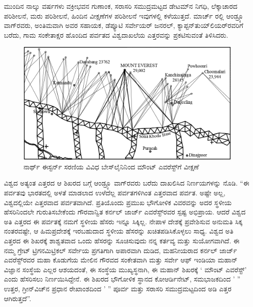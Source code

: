 ಮುಂದಿನ ನಾಲ್ಕು ವರ್ಷಗಳು ವಕ್ರೀಭವನ ಗುಣಾಂಕ, ಸರಾಸರಿ ಸಮುದ್ರಮಟ್ಟದ ಡೇಟಮ್‌ನ ನಿಗಧಿ, ಲೆಕ್ಕಾಚಾರದ ಪರಿಶೀಲನೆ, ಮರು ಪರಿಶೀಲನೆ, ಹಿಂದಿನ ವೀಕ್ಷಣೆಗಳ ಪರಿಶೀಲನೆ ಇವುಗಳಲ್ಲಿ ಕಳೆಯುತ್ತದೆ. ಮಾರ್ಚ್ ರಲ್ಲಿ ಆಂಡ್ರ್ಯೂ ವಾಗ್​ರವರು, ಅಂತಿಮವಾಗಿ ಅವರ ಸಹಾಯಕ, ಡೆಪ್ಯೂಟಿ ಸರ್ವೇಯರ್​ ಜನರಲ್​, ಕ್ಯಾಪ್ಟನ್​ ತುಯ್​ಲಿಯರ್​\break ರವರಿಗೆ ಬರೆದು, ಗಾಮ ಸಂಕೇತಾಕ್ಷರ ಹೊಂದಿದ ಪರ್ವತದ ವಿಶ್ವದಾಖಲೆಯ ಎತ್ತರವನ್ನು ಪ್ರಕಟಿಸುವಂತೆ ತಿಳಿಸಿದರು.

\begin{figure}[!htbp]
\includegraphics{"images/image020.jpg"}
\caption{ನಾರ್ಥ್ ಈಸ್ಟರ್ನ್ ಸರಣಿಯ ವಿವಿಧ ಬೇಸ್‌ಲೈನಿನಿಂದ ಮೌಂಟ್​ ಎವರೆಸ್ಟ್​ಗೆ ವೀಕ್ಷಣೆ}\label{art15-fig2}
\end{figure}

\newpage

ವಿಶ್ವದ ಅತ್ಯಂತ ಎತ್ತರದ ಆ ಶಿಖರದ ಬಗ್ಗೆ ಆಂಡ್ರ್ಯೂ ವಾಗ್​ರವರು ಬರೆದು ದಾಖಲಿಸಿದ ನಿರ್ಣಯಗಳನ್ನು ನೊಡಿ. “ಈ ಪರ್ವತವು ಭಾರತದಲ್ಲಿ ಅಳತೆ ಮಾಡಲಾದ ಉಳೆದೆಲ್ಲ ಪರ್ವತಗಳಿಗಿಂತ ಎತ್ತರವಾದ ಪರ್ವತ. ಅಷ್ಟೇ ಅಲ್ಲ, ವಿಶ್ವದಲ್ಲಿಯೇ ಎತ್ತರವಾದ ಪರ್ವತವಾಗಿದೆ. ಪ್ರತಿಯೊಂದು ಪ್ರಮುಖ ಭೌಗೋಳಿಕ ವಿವರವನ್ನು ಅದರ ಸ್ಥಳೀಯ ಹೆಸರಿನಿಂದಲೇ ಗುರುತಿಸಬೇಕೆಂದು ಗೌರವಾನ್ವಿತ ಕರ್ನಲ್​ ಜಾರ್ಜ್ ಎವರೆಸ್ಟ್​ರವರ ಸ್ಪಷ್ಟ ಅಭಿಪ್ರಾಯ. ಆದರೆ ವಿಶ್ವದ ಅತಿ ಎತ್ತರದ ಈ ಪರ್ವತಕ್ಕೆ ನಮಗೆ ಸ್ಥಳೀಯ ಹೆಸರು ಇನ್ನೂ ಸಿಕ್ಕಿಲ್ಲ. ನೇಪಾಳ ದೇಶಕ್ಕೆ ಪ್ರವೇಶಿಸುವ ಅನುಮತಿ ಸಿಕ್ಕ ನಂತರವಷ್ಟೇ, ಆ ಹಿಮಪ್ರದೇಶಕ್ಕೆ ಇರಬಹುದಾದ ಸ್ಥಳೀಯ ಹೆಸರನ್ನು ಖಚಿತಪಡಿಸಿಕೊಳ್ಳಲು ಸಾಧ್ಯ. ವಿಶ್ವದ ಅತಿ ಎತ್ತರದ ಈ ಶಿಖರಕ್ಕೆ ಶಾಶ್ವತವಾದ ಒಂದು ಹೆಸರನ್ನು ಸೂಚಿಸುವುದು ನನ್ನ ಕರ್ತವ್ಯ ಮತ್ತು ಸುಯೋಗವಾಗಿದೆ. ಈ ನಮ್ಮ ಗ್ರೇಟ್​ ಟ್ರಿಗನಮಿಟ್ರಿಕಲ್​ ಸರ್ವೇಯ ಪ್ರಗತಿಗಾಗಿ ಅಪಾರವಾಗಿ ದುಡಿದ, ಮಹನೀಯರಾದ ಕರ್ನಲ್​ ಜಾರ್ಜ್ ಎವರೆಸ್ಟ್​ರವರ ಮಹಾ ಕೊಡುಗೆಯ ಮೇಲಿನ ಗೌರವದ ಸಂಕೇತವಾಗಿ ಮತ್ತು ಸರ್ವೇ ಆಫ್​ ಇಂಡಿಯಾ ಮಹಾನ್​ ವಿಜ್ಞಾನ ಸಂಸ್ಥೆಯ ಎಲ್ಲರ ಆಶಯದಂತೆ, ಈ ಸಂಸ್ಥೆಯ ಮುಖ್ಯಸ್ಥನಾಗಿ, ಈ ಮಹಾನ್​ ಶಿಖರಕ್ಕೆ ‘ ಮೌಂಟ್​ ಎವರೆಸ್ಟ್​’ ಎಂದು ಹೆಸರಿಸಲು ನಿರ್ಣಯಿಸಿದ್ದೇನೆ. ಈ ಶಿಖರದ ಭೌಗೋಳಿಕ ಸ್ಥಾನದ ಕೋಆರ್ಡಿನೇಟ್​, ಸಮಭಾಜಕದಿಂದ ’ ” ಉತ್ತರ, ಗ್ರೀನ್​ವಿಚ್​ನ ಪ್ರಧಾನ ರೇಖಾಂಶದಿಂದ ’ ” ಪೂರ್ವ ಮತ್ತು ಸರಾಸರಿ ಸಮುದ್ರಮಟ್ಟದಿಂದ  ಅಡಿ ಎತ್ತರ ಆಗಿರುತ್ತದೆ”.


